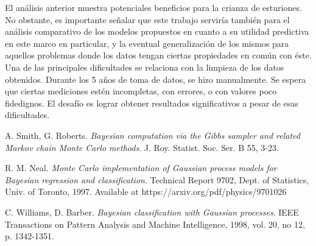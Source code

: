 \documentclass[letterpaper, 12pt]{article}
\begin{document}
El análisis anterior muestra potenciales beneficios para la crianza de esturiones. No obstante, es importante señalar que este trabajo serviría también para el análisis comparativo de los modelos propuestos en cuanto a su utilidad predictiva en este marco en particular, y la eventual generalización de los mismos para aquellos problemas donde los datos tengan ciertas propiedades en común con éste.\\

Una de las principales dificultades se relaciona con la limpieza de los datos obtenidos. Durante los 5 años de toma de datos, se hizo manualmente. Se espera que ciertas mediciones estén incompletas, con errores, o con valores poco fidedignos. El desafío es lograr obtener resultados significativos a pesar de esas dificultades.\\



\begin{thebibliography}{3} %

A. Smith, G. Roberts. \emph{Bayesian computation via the Gibbs sampler and related Markov chain Monte Carlo methods}. J. Roy. Statist. Soc. Ser. B 55, 3-23.

R. M. Neal. \emph{Monte Carlo implementation of Gaussian process models for Bayesian regression and classification}. Technical Report 9702, Dept. of Statistics, Univ. of Toronto, 1997. Available
at https://arxiv.org/pdf/physics/9701026

C. Williams, D. Barber. \emph{Bayesian classification with Gaussian processes}. IEEE Transactions on Pattern Analysis and Machine Intelligence, 1998, vol. 20, no 12, p. 1342-1351.

\end{thebibliography}

%
\end{document}
